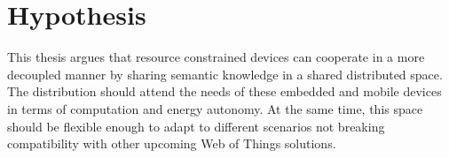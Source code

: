 \section{Hypothesis}
\label{sec:Hypothesis}

This thesis argues that resource constrained devices can cooperate in a more decoupled manner by sharing semantic knowledge in a shared distributed space.
The distribution should attend the needs of these embedded and mobile devices in terms of computation and energy autonomy.
At the same time, this space should be flexible enough to adapt to different scenarios not breaking compatibility with other upcoming Web of Things solutions.